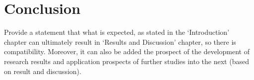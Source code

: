 \section{Conclusion}
\label{Conclusion}
Provide a statement that what is expected, as stated in the `Introduction' chapter can ultimately result in `Results and Discussion' chapter, so there is compatibility. Moreover, it can also be added the prospect of the development of research results and application prospects of further studies into the next (based on result and discussion).